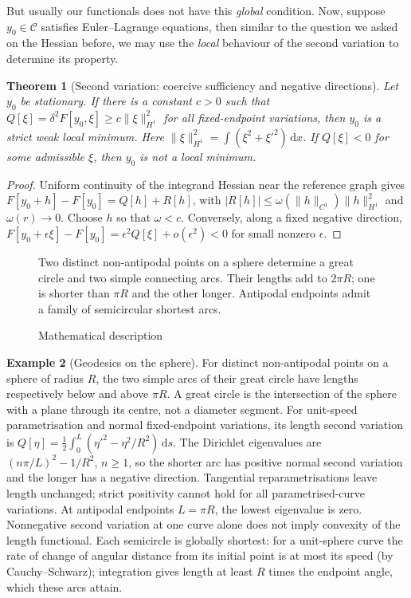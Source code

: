 \documentclass[11pt]{article}
\numberwithin{equation}{section}
\newtheorem{theorem}{Theorem}[section]
\theoremstyle{definition}
\newtheorem{example}[theorem]{Example}
\theoremstyle{remark}
\begin{document}
But usually our functionals does not have this \emph{global} condition. Now, suppose \(y_0 \in \mathcal{C}\) satisfies Euler--Lagrange equations, then similar to the question we asked on the Hessian before, we may use the \emph{local} behaviour of the second variation to determine its property.

\begin{theorem}[Second variation: coercive sufficiency and negative directions]\label{variation-unit-0092}
\label{thm:coercive-sufficiency}
Let \(y_0\) be stationary. If there is a constant \(c>0\) such that
\(Q[\xi]=\delta^2F[y_0,\xi]\ge c\|\xi\|_{H^1}^2\) for all fixed-endpoint
variations, then \(y_0\) is a strict weak local minimum. Here
\(\|\xi\|_{H^1}^2=\int(\xi^2+\xi'^2)\,\mathrm dx\).
If \(Q[\xi]<0\) for some admissible \(\xi\), then \(y_0\) is not a local minimum.
\end{theorem}
\begin{proof}
Uniform continuity of the integrand Hessian near the reference graph gives
\(F[y_0+h]-F[y_0]=Q[h]+R[h]\), with
\(|R[h]|\le\omega(\|h\|_{C^1})\|h\|_{H^1}^2\) and \(\omega(r)\to0\).
Choose \(h\) so that \(\omega<c\). Conversely, along a fixed negative direction,
\(F[y_0+\epsilon\xi]-F[y_0]=\epsilon^2Q[\xi]+o(\epsilon^2)<0\) for small nonzero \(\epsilon\).
\end{proof}

\begin{figure}[ht!]\centering\begin{minipage}{.94\linewidth}Two distinct non-antipodal points on a sphere determine a great circle and two simple connecting arcs. Their lengths add to \(2\pi R\); one is shorter than \(\pi R\) and the other longer. Antipodal endpoints admit a family of semicircular shortest arcs.\end{minipage}\caption{Mathematical description}\label{fig:geodesics-on-the-sphere}\end{figure}

\begin{example}[Geodesics on the sphere]\label{variation-unit-0093}
For distinct non-antipodal points on a sphere of radius \(R\), the two simple
arcs of their great circle have lengths respectively below and above \(\pi R\).
A great circle is the intersection of the sphere with a plane through its centre,
not a diameter segment. For unit-speed parametrisation and normal fixed-endpoint
variations, its length second variation is
\(Q[\eta]=\tfrac12\int_0^L(\eta'^2-\eta^2/R^2)\,\mathrm ds\).
The Dirichlet eigenvalues are \((n\pi/L)^2-1/R^2\), \(n\ge1\), so the shorter
arc has positive normal second variation and the longer has a negative direction.
Tangential reparametrisations leave length unchanged; strict positivity cannot hold
for all parametrised-curve variations. At antipodal endpoints \(L=\pi R\), the
lowest eigenvalue is zero. Nonnegative second variation at one curve alone does
not imply convexity of the length functional. Each semicircle is globally shortest:
for a unit-sphere curve the rate of change of angular distance from its initial
point is at most its speed (by Cauchy--Schwarz); integration gives length at least
\(R\) times the endpoint angle, which these arcs attain.
\end{example}
\end{document}
